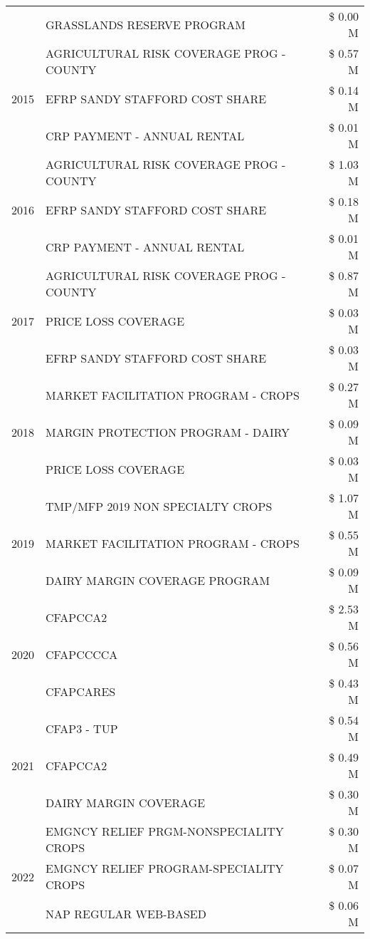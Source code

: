 \begin{tabular}{llr}
 & GRASSLANDS RESERVE PROGRAM & \$ 0.00 M \\
\cline{1-3}
\multirow[t]{3}{*}{2015} & AGRICULTURAL RISK COVERAGE PROG - COUNTY & \$ 0.57 M \\
 & EFRP SANDY STAFFORD COST SHARE & \$ 0.14 M \\
 & CRP PAYMENT - ANNUAL RENTAL & \$ 0.01 M \\
\cline{1-3}
\multirow[t]{3}{*}{2016} & AGRICULTURAL RISK COVERAGE PROG - COUNTY & \$ 1.03 M \\
 & EFRP SANDY STAFFORD COST SHARE & \$ 0.18 M \\
 & CRP PAYMENT - ANNUAL RENTAL & \$ 0.01 M \\
\cline{1-3}
\multirow[t]{3}{*}{2017} & AGRICULTURAL RISK COVERAGE PROG - COUNTY & \$ 0.87 M \\
 & PRICE LOSS COVERAGE & \$ 0.03 M \\
 & EFRP SANDY STAFFORD COST SHARE & \$ 0.03 M \\
\cline{1-3}
\multirow[t]{3}{*}{2018} & MARKET FACILITATION PROGRAM - CROPS & \$ 0.27 M \\
 & MARGIN PROTECTION PROGRAM - DAIRY & \$ 0.09 M \\
 & PRICE LOSS COVERAGE & \$ 0.03 M \\
\cline{1-3}
\multirow[t]{3}{*}{2019} & TMP/MFP 2019 NON SPECIALTY CROPS & \$ 1.07 M \\
 & MARKET FACILITATION PROGRAM - CROPS & \$ 0.55 M \\
 & DAIRY MARGIN COVERAGE PROGRAM & \$ 0.09 M \\
\cline{1-3}
\multirow[t]{3}{*}{2020} & CFAPCCA2 & \$ 2.53 M \\
 & CFAPCCCCA & \$ 0.56 M \\
 & CFAPCARES & \$ 0.43 M \\
\cline{1-3}
\multirow[t]{3}{*}{2021} & CFAP3 - TUP & \$ 0.54 M \\
 & CFAPCCA2 & \$ 0.49 M \\
 & DAIRY MARGIN COVERAGE & \$ 0.30 M \\
\cline{1-3}
\multirow[t]{3}{*}{2022} & EMGNCY RELIEF PRGM-NONSPECIALITY CROPS & \$ 0.30 M \\
 & EMGNCY RELIEF PROGRAM-SPECIALITY CROPS & \$ 0.07 M \\
 & NAP REGULAR WEB-BASED & \$ 0.06 M \\
\cline{1-3}
\bottomrule
\end{tabular}
